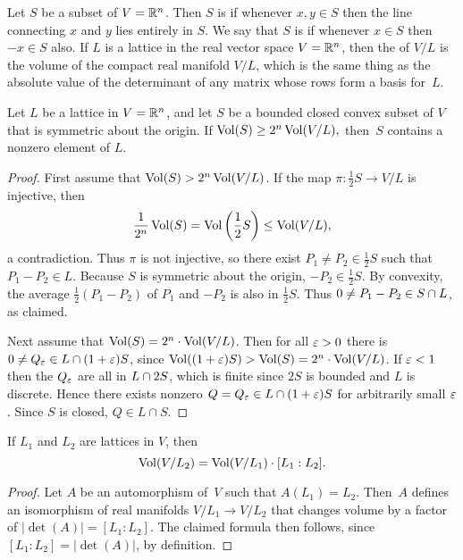 Let $S$ be a subset of $V=\mathbb{R}^n$.  Then $S$ is  if
whenever $x,y\in S$ then the line connecting $x$ and $y$ lies entirely
in $S$.  We say that $S$ is  if
whenever $x\in S$ then $-x\in S$ also.  If $L$ is a lattice in the
real vector space $V=\mathbb{R}^n$, then the  of $V/L$ is the
volume of the compact real manifold $V/L$, which is the same thing as
the absolute value of the determinant of any matrix whose rows form a
basis for~$L$.
\begin{lemma}[Blichfeld]\label{lem:blichfeld}
	Let $L$ be a lattice in $V=\mathbb{R}^n$, and let $S$ be a
	bounded closed convex subset of $V$ that is symmetric about the
	origin.  If
	$\operatorname{Vol}(S)\geq 2^n \operatorname{Vol}(V/L),$
	then~$S$ contains a nonzero element of $L$.
\end{lemma}
\begin{proof}
	First assume that $\operatorname{Vol}(S)>2^n \operatorname{Vol}(V/L)$.
	If the map $\pi: \frac{1}{2}S \to V/L$ is injective, then
	$$
		\frac{1}{2^n}\operatorname{Vol}(S) = \operatorname{Vol}\left(\frac{1}{2} S\right)\leq \operatorname{Vol}(V/L),
	$$
	a contradiction.  Thus $\pi$ is not injective, so there
	exist $P_1\neq P_2\in \frac{1}{2}S$ such that $P_1-P_2\in L$.
	Because $S$ is symmetric about the origin, $-P_2\in \frac{1}{2}S$.
	By convexity, the average $\frac{1}{2}(P_1-P_2)$ of $P_1$ and $-P_2$
	is also in $\frac{1}{2}S$.  Thus $0\neq P_1-P_2 \in S\cap L$,
	as claimed.

	Next assume that $\operatorname{Vol}(S) = 2^n\cdot \operatorname{Vol}(V/L)$.  Then for all
	$\varepsilon>0$ there is $0\neq Q_\varepsilon \in L\cap (1+\varepsilon) S$,
	since $\operatorname{Vol}((1+\varepsilon)S)>\operatorname{Vol}(S)=2^n\cdot \operatorname{Vol}(V/L)$.
	If $\varepsilon<1$ then the $Q_\varepsilon$ are all in $L\cap{} 2 S$,
	which is finite since $2S$ is bounded and $L$ is discrete.
	Hence there exists nonzero $Q=Q_\varepsilon\in L\cap{} (1+\varepsilon) S$ for arbitrarily
	small $\varepsilon$.  Since $S$ is closed, $Q\in L\cap S$.
\end{proof}

\begin{lemma}\label{lem:latticevolchange}
	If $L_1$ and $L_2$ are lattices in $V$, then
	$$
	   \operatorname{Vol}(V/L_2) = \operatorname{Vol}(V/L_1) \cdot [L_1:L_2].
	$$
\end{lemma}
\begin{proof}
	Let $A$ be an automorphism of~$V$ such that $A(L_1)=L_2$.  Then~$A$
	defines an isomorphism of real manifolds $V/L_1\to V/L_2$ that changes
	volume by a factor of $\left|\det(A)\right|=[L_1:L_2]$.
	The claimed formula then follows,
	since $[L_1:L_2] = \left|\det(A)\right|$, by definition.
\end{proof}

